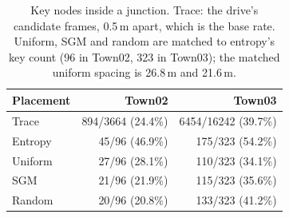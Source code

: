 \begin{table}[t]
\centering
\caption{Key nodes inside a junction. Trace: the drive's candidate frames, 0.5\,m apart,
which is the base rate. Uniform, SGM and random are matched to entropy's key count
(96 in Town02, 323 in Town03); the matched uniform spacing is 26.8\,m and 21.6\,m.}
\label{tab:junction_nodes}
\begin{tabular}{lrr}
\toprule
Placement & Town02 & Town03 \\
\midrule
Trace   & 894/3664 (24.4\%) & 6454/16242 (39.7\%) \\
\midrule
Entropy & 45/96 (46.9\%) & 175/323 (54.2\%) \\
Uniform & 27/96 (28.1\%) & 110/323 (34.1\%) \\
SGM     & 21/96 (21.9\%) & 115/323 (35.6\%) \\
Random  & 20/96 (20.8\%) & 133/323 (41.2\%) \\
\bottomrule
\end{tabular}
\end{table}
